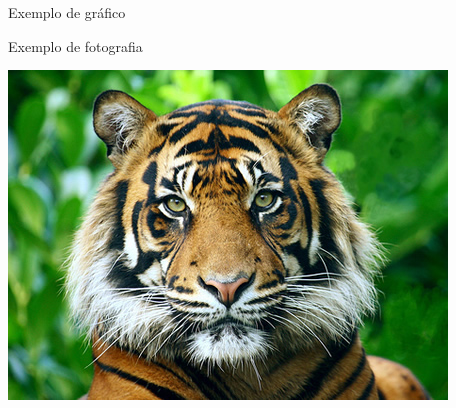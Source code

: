 \begin{grafico}[!htpb]
 \centering
	\caption{Exemplo de gráfico}
	\label{graf:grafico2}
\end{grafico}



\begin{fotografia}[!htpb]
 \centering
	\caption{Exemplo de fotografia}
	\label{fot:grafico3}
 	\includegraphics[width=\textwidth]{figuras/fotografia}
\end{fotografia}

